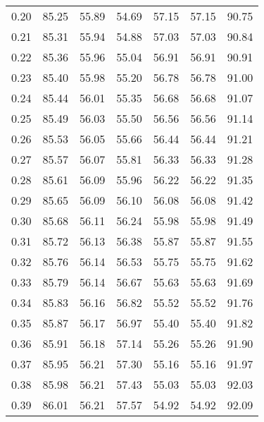 \begin{tabular}{|c|c|c|c|c|c|c|}
      0.20 &     85.25 &     55.89 &      54.69 &   57.15 &      57.15 &         90.75 \\
      0.21 &     85.31 &     55.94 &      54.88 &   57.03 &      57.03 &         90.84 \\
      0.22 &     85.36 &     55.96 &      55.04 &   56.91 &      56.91 &         90.91 \\
      0.23 &     85.40 &     55.98 &      55.20 &   56.78 &      56.78 &         91.00 \\
      0.24 &     85.44 &     56.01 &      55.35 &   56.68 &      56.68 &         91.07 \\
      0.25 &     85.49 &     56.03 &      55.50 &   56.56 &      56.56 &         91.14 \\
      0.26 &     85.53 &     56.05 &      55.66 &   56.44 &      56.44 &         91.21 \\
      0.27 &     85.57 &     56.07 &      55.81 &   56.33 &      56.33 &         91.28 \\
      0.28 &     85.61 &     56.09 &      55.96 &   56.22 &      56.22 &         91.35 \\
      0.29 &     85.65 &     56.09 &      56.10 &   56.08 &      56.08 &         91.42 \\
      0.30 &     85.68 &     56.11 &      56.24 &   55.98 &      55.98 &         91.49 \\
      0.31 &     85.72 &     56.13 &      56.38 &   55.87 &      55.87 &         91.55 \\
      0.32 &     85.76 &     56.14 &      56.53 &   55.75 &      55.75 &         91.62 \\
      0.33 &     85.79 &     56.14 &      56.67 &   55.63 &      55.63 &         91.69 \\
      0.34 &     85.83 &     56.16 &      56.82 &   55.52 &      55.52 &         91.76 \\
      0.35 &     85.87 &     56.17 &      56.97 &   55.40 &      55.40 &         91.82 \\
      0.36 &     85.91 &     56.18 &      57.14 &   55.26 &      55.26 &         91.90 \\
      0.37 &     85.95 &     56.21 &      57.30 &   55.16 &      55.16 &         91.97 \\
      0.38 &     85.98 &     56.21 &      57.43 &   55.03 &      55.03 &         92.03 \\
      0.39 &     86.01 &     56.21 &      57.57 &   54.92 &      54.92 &         92.09 \\

\end{tabular}

